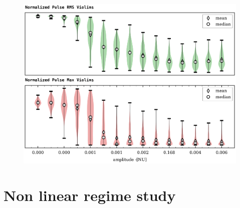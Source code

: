 \documentclass[11pt,a4paper]{report}
\begin{document}
\begin{figure}[H]
    \centering
    \includegraphics[width=1\linewidth]{./figures/pulse_overview.png}
    \caption{}
    \label{fig:barrier}
\end{figure}
\chapter{Non linear regime study}

\newpage
\end{document}
